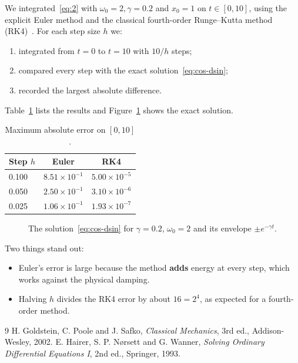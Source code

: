 \documentclass[11pt,a4paper]{article}
\begin{document}
We integrated~\eqref{eq:2} with $\omega_{0}=2,\gamma=0.2$ and $x_{0}=1$ on $t\in[0,10]$, using the explicit Euler method and the classical fourth-order Runge--Kutta method (RK4)~\cite{ref2}. For each step size $h$ we:

\begin{enumerate}
  \item integrated from $t=0$ to $t=10$ with $10/h$ steps;
  \item compared every step with the exact solution~\eqref{eq:cos-dsin};
  \item recorded the largest absolute difference.
\end{enumerate}

Table~\ref{tab:maximum-absolute} lists the results and Figure~\ref{fig:the-solution} shows the exact solution.

\begin{table}[htbp]
  \centering
  \caption{Maximum absolute error on $[0,10]$.}
  \label{tab:maximum-absolute}
  \begin{tabular}{lcc}
    \toprule
    \textbf{Step $h$} & \textbf{Euler} & \textbf{RK4} \\
    \midrule
    0.100 & $8.51\times10^{-1}$ & $5.00\times10^{-5}$ \\
    0.050 & $2.50\times10^{-1}$ & $3.10\times10^{-6}$ \\
    0.025 & $1.06\times10^{-1}$ & $1.93\times10^{-7}$ \\
    \bottomrule
  \end{tabular}
\end{table}

\begin{figure}[htbp]
  \centering
  \caption{The solution~\eqref{eq:cos-dsin} for $\gamma=0.2$, $\omega_{0}=2$ and its envelope $\pm e^{-\gamma t}$.}
  \label{fig:the-solution}
\end{figure}

Two things stand out:

\begin{itemize}
  \item Euler's error is large because the method \textbf{adds} energy at every step, which works against the physical damping.
  \item Halving $h$ divides the RK4 error by about $16=2^{4}$, as expected for a fourth-order method.
\end{itemize}

\begin{thebibliography}{9}
 H. Goldstein, C. Poole and J. Safko, \emph{Classical Mechanics}, 3rd ed., Addison-Wesley, 2002.
 E. Hairer, S. P. Nørsett and G. Wanner, \emph{Solving Ordinary Differential Equations I}, 2nd ed., Springer, 1993.
\end{thebibliography}
\end{document}
